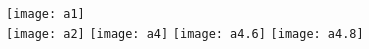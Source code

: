 \documentclass[12pt, twoside, a4paper]{article}
\begin{document}
	\hspace*{-2cm}
	\texttt{[image: a1]}\\
	\hspace*{-2cm}
	\texttt{[image: a2]}
	\hspace*{-2cm}
	\texttt{[image: a4]}	
	\hspace*{-2cm}
	\texttt{[image: a4.6]}
	\hspace*{-2cm}
	\texttt{[image: a4.8]}
	
\end{document}
